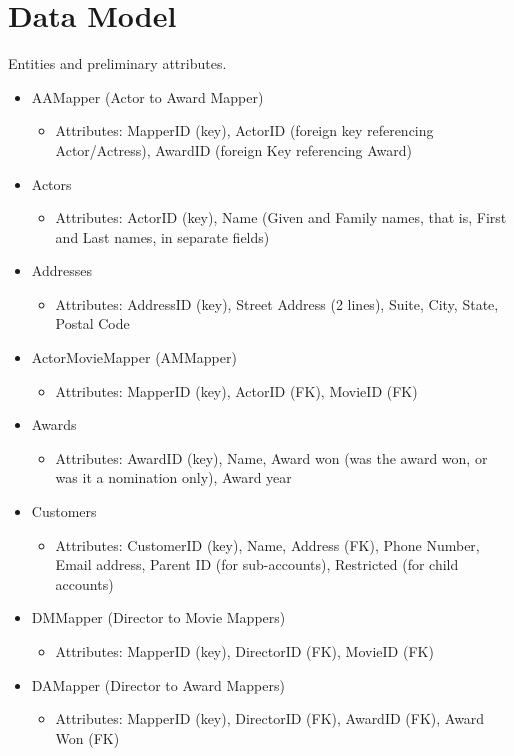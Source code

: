 \documentclass[letterpaper,12pt]{article}
\begin{document}
\section{Data Model}
Entities and preliminary attributes.
\begin{itemize}
    	\item AAMapper (Actor to Award Mapper)
    \begin{itemize}
        \item Attributes: MapperID (key), ActorID (foreign key referencing Actor/Actress), AwardID (foreign Key referencing Award)
    \end{itemize}
    
	\item Actors
	      \begin{itemize}
		      \item Attributes: ActorID (key), Name (Given and Family names, that is, First and Last names, in separate fields)
	      \end{itemize}
	\item Addresses
	      \begin{itemize}
		      \item Attributes: AddressID (key), Street Address (2 lines), Suite, City, State, Postal Code
	      \end{itemize}
	\item ActorMovieMapper (AMMapper)
\begin{itemize}
    \item Attributes: MapperID (key), ActorID (FK), MovieID (FK)
\end{itemize}

	\item Awards
	      \begin{itemize}
		      \item Attributes: AwardID (key), Name, Award won (was the award won, or was it a nomination only), Award year
	      \end{itemize}
	\item Customers
	      \begin{itemize}
		      \item Attributes: CustomerID (key), Name, Address (FK), Phone Number, Email address, Parent ID (for sub-accounts), Restricted (for child accounts)
	      \end{itemize}
	\item DMMapper (Director to Movie Mappers)
\begin{itemize}
    \item Attributes: MapperID (key), DirectorID (FK), MovieID (FK)
\end{itemize}
	\item DAMapper (Director to Award Mappers)
\begin{itemize}
    \item Attributes: MapperID (key), DirectorID (FK), AwardID (FK), Award Won (FK)
\end{itemize}


\end{itemize}
\end{document}
